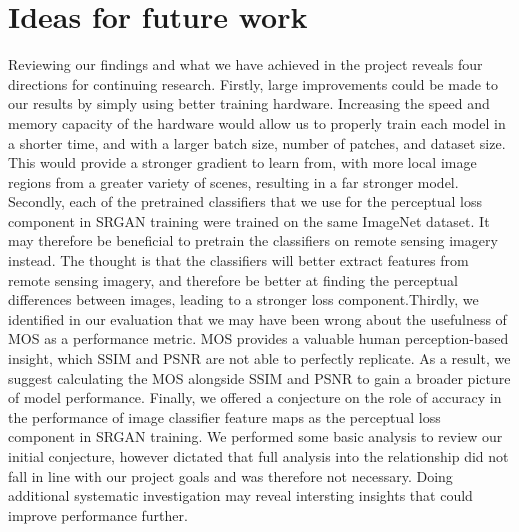 \section{Ideas for future work}
Reviewing our findings and what we have achieved in the project reveals four directions for continuing research. Firstly, large improvements could be made to our results by simply using better training hardware. Increasing the speed and memory capacity of the hardware would allow us to properly train each model in a shorter time, and with a larger batch size, number of patches, and dataset size. This would provide a stronger gradient to learn from, with more local image regions from a greater variety of scenes, resulting in a far stronger model. Secondly, each of the pretrained classifiers that we use for the perceptual loss component in SRGAN training were trained on the same ImageNet dataset. It may therefore be beneficial to pretrain the classifiers on remote sensing imagery instead. The thought is that the classifiers will better extract features from remote sensing imagery, and therefore be better at finding the perceptual differences between images, leading to a stronger loss component.Thirdly, we identified in our evaluation that we may have been wrong about the usefulness of MOS as a performance metric. MOS provides a valuable human perception-based insight, which SSIM and PSNR are not able to perfectly replicate. As a result, we suggest calculating the MOS alongside SSIM and PSNR to gain a broader picture of model performance. Finally, we offered a conjecture on the role of accuracy in the performance of image classifier feature maps as the perceptual loss component in SRGAN training. We performed some basic analysis to review our initial conjecture, however dictated that full analysis into the relationship did not fall in line with our project goals and was therefore not necessary. Doing additional systematic investigation may reveal intersting insights that could improve performance further.
